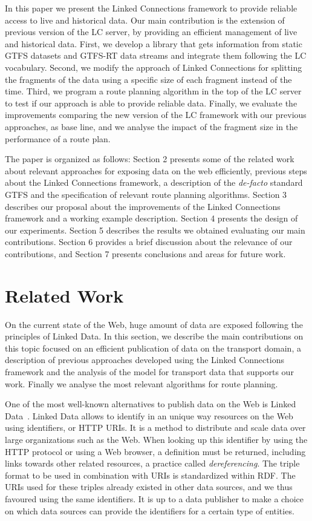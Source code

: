 \documentclass[sw]{iosart2x}
\begin{document}
	In this paper we present the Linked Connections framework to provide reliable access to live and historical data. Our main contribution is the extension of previous version of the LC server, by providing an efficient management of live and historical data. First, we develop a library that gets information from static GTFS datasets and GTFS-RT data streams and integrate them following the LC vocabulary. Second, we modify the approach of Linked Connections for splitting the fragments of the data using a specific size of each fragment instead of the time. Third, we program a route planning algorithm in the top of the LC server to test if our approach is able to provide reliable data. Finally, we evaluate the improvements comparing the new version of the LC framework with our previous approaches, as base line, and we analyse the impact of the fragment size in the performance of a route plan.
	
	The paper is organized as follows: Section 2 presents some of the related work about relevant approaches for exposing data on the web efficiently,  previous steps about the Linked Connections framework, a description of the \textit{de-facto} standard GTFS and the specification of relevant route planning algorithms. Section 3 describes our proposal about the improvements of the Linked Connections framework and a working example description. Section 4 presents the design of our experiments. Section 5 describes the results we obtained evaluating our main contributions. Section 6 provides a brief discussion about the relevance of our contributions, and Section 7 presents conclusions and areas for future work.
	
	
	\section{Related Work}\label{related_work} %
	On the current state of the Web, huge amount of data are exposed following the principles of Linked Data. In this section, we describe the main contributions on this topic focused on an efficient publication of data on the transport domain, a description of previous approaches developed using the Linked Connections framework and the analysis of the model for transport data that supports our work. Finally we analyse the most relevant algorithms for route planning.
	
	One of the most well-known alternatives to publish data on the Web is Linked Data~\cite{bizer2009linked}. Linked Data allows to identify in an unique way resources on the Web using identifiers, or HTTP URIs. It is a method to distribute and scale data over large organizations such as the Web. When looking up this identifier by using the HTTP protocol or using a Web browser, a definition must be returned, including links towards other related resources, a practice called \textit{dereferencing}. The triple format to be used in combination with URIs is standardized within RDF. The URIs used for these triples already existed in other data sources, and we thus favoured using the same identifiers. It is up to a data publisher to make a choice on which data sources can provide the identifiers for a certain type of entities. 
	
\end{document}
